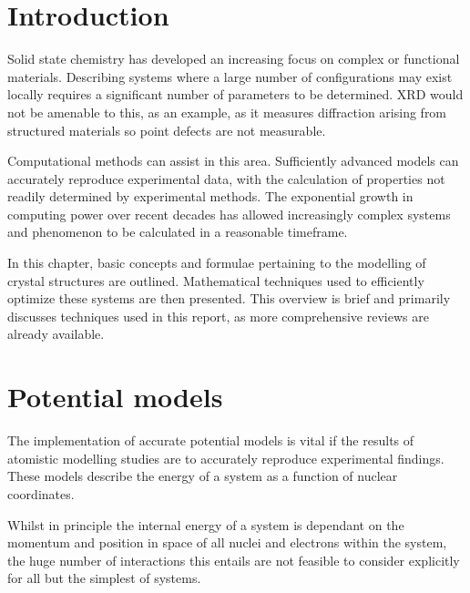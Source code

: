 \section{Introduction} %
Solid state chemistry has developed an increasing focus on complex or functional materials.
Describing systems where a large number of configurations may exist locally requires a significant number of parameters to be determined.
XRD would not be amenable to this, as an example, as it measures diffraction arising from structured materials so point defects are not measurable.

Computational methods can assist in this area. Sufficiently advanced models can accurately reproduce experimental data, with the calculation of properties not readily determined by experimental methods.
The exponential growth in computing power over recent decades has allowed increasingly complex systems and phenomenon to be calculated in a reasonable timeframe.

In this chapter, basic concepts and formulae pertaining to the modelling of crystal structures are outlined.
Mathematical techniques used to efficiently optimize these systems are then presented.
This overview is brief and primarily discusses techniques used in this report, as more comprehensive reviews are already available. \cite{Gale2003,Jensen2007,Catlow2013}



\section{Potential models}
The implementation of accurate potential models is vital if the results of atomistic modelling studies are to accurately reproduce experimental findings.
These models describe the energy of a system as a function of nuclear coordinates.

Whilst in principle the internal energy of a system is dependant on the momentum and position in space of all nuclei and electrons within the system, the huge number of interactions this entails are not feasible to consider explicitly for all but the simplest of systems.

